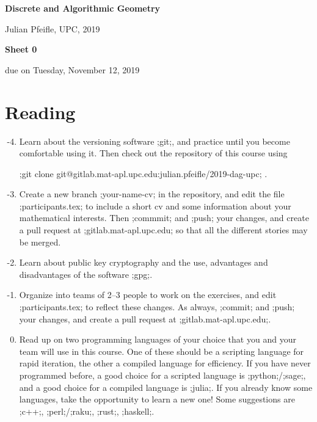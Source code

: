 \documentclass[11pt]{amsart}
\begin{document}
\begin{center}
\textbf{\sffamily
   Discrete and Algorithmic Geometry }

\medskip
   Julian Pfeifle,
   UPC, 2019
\end{center}

\bigskip

\begin{center}
  \textbf{\sffamily Sheet 0}

\bigskip
\bigskip
 due on Tuesday, November 12, 2019

\end{center}

\bigskip

\section*{Reading}

\begin{enumerate}
  \setcounter{enumi}{-5}
\item
  Learn about the versioning software ;git;, and practice until you become comfortable using it.
  Then check out the repository of this course using
  \begin{center}
    ;git clone git@gitlab.mat-apl.upc.edu:julian.pfeifle/2019-dag-upc; .
  \end{center}

  \medskip
\item
  Create a new branch ;your-name-cv; in the repository, and edit the file ;participants.tex; to include a short cv and some information about your mathematical interests.
  Then ;commmit; and ;push; your changes, and create a pull request at ;gitlab.mat-apl.upc.edu; so that all the different stories may be merged.
  
  \medskip
\item
  Learn about public key cryptography and the use, advantages and disadvantages of the software ;gpg;.

  \medskip
\item
  Organize into teams of 2--3 people to work on the exercises, and
  edit  ;participants.tex; to reflect these changes.
  As always, ;commit; and ;push; your changes, and create a pull request at ;gitlab.mat-apl.upc.edu;.

  \medskip
\item
  Read up on two programming languages of your choice that you and your team will use in this course.
  One of these should be a scripting language for rapid iteration, the other a compiled language for efficiency.
  If you have never programmed before, a good choice for a scripted language is ;python;/;sage;, and a good choice for a compiled language is ;julia;.
  If you already know some languages, take the opportunity to learn a new one! Some suggestions are ;c++;, ;perl;/;raku;, ;rust;, ;haskell;.
\end{enumerate}
\end{document}
